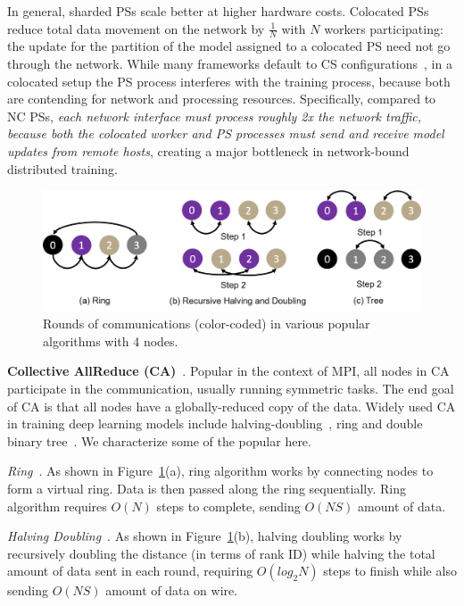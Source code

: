In general, sharded PSs scale better at higher hardware costs. Colocated PSs reduce total data movement on the network by $\frac{1}{N}$ with $N$ workers participating: the update for the partition of the model assigned to a colocated PS need not go through the network. While many frameworks default to CS configurations~\cite{MXNetont0:online, Distribu25:online}, in a colocated setup the PS process interferes with the training process, because both are contending for network and processing resources. Specifically, compared to NC PSs, \textit{each network interface must process roughly 2x the network traffic, because both the colocated worker and PS processes must send and receive model updates from remote hosts}, creating a major bottleneck in network-bound distributed training. 

\begin{figure}[t!]
	\centering
	\includegraphics[width=.6\linewidth]{Figures/collectivesAlgorithms.png}
	\caption{Rounds of communications (color-coded) in various popular \collectives algorithms with 4 nodes.}
	\label{fig:collectivesAlgorithm}
\end{figure}

\noindent\textbf{Collective AllReduce (CA)}~\cite{Sack:2011:SCM:2522220,Thakur:2005:OCC:2747766.2747771,collectivesOptimization,blum2000architectures,bala1995ccl}. Popular in the context of MPI, all nodes in CA participate in the communication, usually running symmetric tasks. The end goal of CA is that all nodes have a globally-reduced copy of the data. Widely used CA in training deep learning models include halving-doubling~\cite{ImageNetIn1Hour}, ring and double binary tree~\cite{Operatio73:online, Sergeev2018HorovodFA}. We characterize some of the popular \cmpi here.

\noindent\textit{Ring}~\cite{patarasuk2009bandwidth}. As shown in Figure~\ref{fig:collectivesAlgorithm}(a), ring algorithm works by connecting nodes to form a virtual ring. Data is then passed along the ring sequentially. Ring algorithm requires $O(N)$ steps to complete, sending $O(NS)$ amount of data.

\noindent\textit{Halving Doubling}~\cite{Thakur:2005:OCC:2747766.2747771}. As shown in Figure~\ref{fig:collectivesAlgorithm}(b), halving doubling works by recursively doubling the distance (in terms of rank ID) while halving the total amount of data sent in each round, requiring $O(log_{2}{N})$ steps to finish while also sending $O(NS)$ amount of data on wire.

